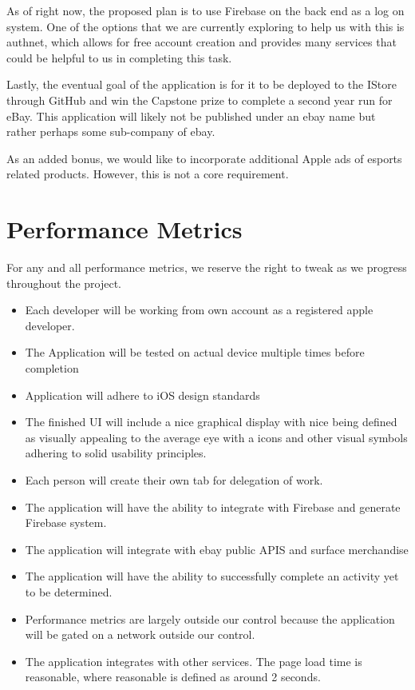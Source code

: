 \documentclass[onecolumn, draftclsnofoot,10pt, compsoc]{IEEEtran}
\begin{document}
\par As of right now, the proposed plan is to use Firebase on the back end as a log on system. One of the options that we are currently exploring to help us with this is authnet, which allows for free account creation and provides many services that could be helpful to us in completing this task.
\par Lastly, the eventual goal of the application is for it to be deployed to the IStore through GitHub and win the Capstone prize to complete a second year run for eBay. This application will likely not be published under an ebay name but rather perhaps some sub-company of ebay.
\par As an added bonus, we would like to incorporate additional Apple ads of esports related products. However, this is not a core requirement.
\section{Performance Metrics}
For any and all performance metrics, we reserve the right to tweak as we progress throughout the project.
\begin{itemize}
   \item  Each developer will be working from own account as a registered apple developer.
   \item The Application will be tested on actual device multiple times before completion
     \item Application will adhere to iOS design standards
      \item The finished UI will include a nice graphical display with nice being defined as visually appealing to the average eye with a icons and other visual symbols adhering to solid usability principles.
	   \item Each person will create their own tab for delegation of work. 
        \item The application will have the ability to integrate with Firebase and generate Firebase system.
         \item The application will integrate with ebay public APIS and surface merchandise
          \item The application will have the ability to successfully complete an activity yet to be determined.
           \item Performance metrics are largely outside our control because the application will be gated on a network outside our control.
            \item The application integrates with other services.
The page load time is reasonable, where reasonable is defined as
around 2 seconds.
\end{itemize}
\end{document}
